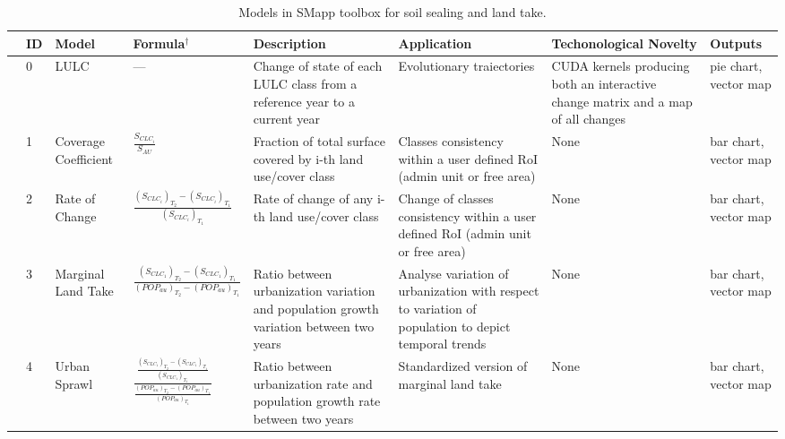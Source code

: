 \documentclass[APA,LATO1COL,doublespace]{WileyNJD-v2}
\begin{document}
\begin{table}[b]
    \caption{ Models in SMapp toolbox for soil sealing and land take. }
    \label{tab:SMappToolbox}
    \small
    \centering
    \begin{tabular}{m{0.3cm} p{0.1cm} p{1.2cm} p{3.5cm} *{3}{p{2.7cm}} p{1.0cm} }
    
    \toprule
        & \textbf{ID} & \textbf{Model} & \textbf{Formula$^\dagger$} & \textbf{Description} & \textbf{Application} & \textbf{Techonological Novelty} & \textbf{Outputs}\\
    \midrule\midrule
    
    & 0 & LULC & --- & Change of state of each LULC class from a reference year to a current year & Evolutionary traiectories & CUDA kernels producing both an interactive change matrix and a map of all changes & pie chart, vector map  \\
    
    & 1	& Coverage Coefficient & $\frac{S_{CLC_i}}{S_{AU}}$ & Fraction of total surface covered by i-th land use/cover class & Classes consistency within a user defined RoI (admin unit or free area) & None & bar chart, vector map \\
        
    & 2 & Rate of Change & 
    $\frac{ \left(S_{CLC_i}\right)_{T_2} - \left(S_{CLC_i}\right)_{T_1} }{ \left(S_{CLC_i}\right)_{T_1} }$ 
    & Rate of change of any i-th land use/cover class & Change of classes consistency within a user defined RoI (admin unit or free area) & None & bar chart, vector map \\
    
    & 3 & Marginal Land Take & 
    $\frac{ \left(S_{CLC_1}\right)_{T_2} - \left(S_{CLC_1}\right)_{T_1} }{ \left(POP_{au}\right)_{T_2} - \left(POP_{au}\right)_{T_1} }$
    & Ratio between urbanization variation and population growth variation between two years & Analyse variation of urbanization with respect to variation of population to depict temporal trends & None & bar chart, vector map \\
    
    & 4	& Urban Sprawl & 
    $\frac{ \frac{ \left(S_{CLC_1}\right)_{T_2} - \left(S_{CLC_1}\right)_{T_1} }{ \left(S_{CLC_1}\right)_{T_1} }  }     { \frac{ \left(POP_{au}\right)_{T_2} - \left(POP_{au}\right)_{T_1} }{ \left(POP_{au}\right)_{T_1} } }$
    & Ratio between urbanization rate and population growth rate between two years & Standardized version of marginal land take & None & bar chart, vector map \\
    

\end{tabular}
\end{table}
\end{document}
